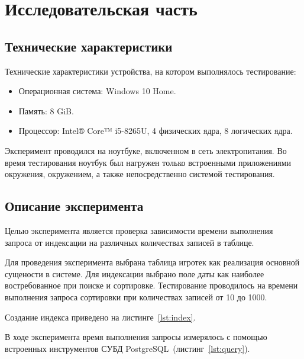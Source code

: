 \chapter{Исследовательская часть}

\section{Технические характеристики}

Технические характеристики устройства, на котором выполнялось тестирование:

\begin{itemize}
	\item Операционная система: Windows 10 Home.
	\item Память: 8 GiB.
    \item Процессор: Intel® Core™ i5-8265U, 4 физических ядра, 8 логических
        ядра.
\end{itemize}

Эксперимент проводился на ноутбуке, включенном в сеть электропитания. Во
время тестирования ноутбук был нагружен только встроенными приложениями
окружения, окружением, а также непосредственно системой тестирования.

\section{Описание эксперимента}

Целью эксперимента является проверка зависимости времени выполнения запроса от
индексации на различных количествах записей в таблице.

Для проведения эксперимента выбрана таблица игротек как реализация основной
сущености в системе. Для индексации выбрано поле даты как наиболее
востребованное при поиске и сортировке. Тестирование проводилось на времени
выполнения запроса сортировки при количествах записей от 10 до 1000.

Создание индекса приведено на листинге~\ref{lst:index}.

{
\captionsetup{format=hang,justification=raggedright,
              singlelinecheck=off,width=16cm}
}

В ходе эксперимента время выполнения запросы измерялось с помощью встроенных
инструментов СУБД PostgreSQL~(листинг~\ref{lst:query}).

{
\captionsetup{format=hang,justification=raggedright,
              singlelinecheck=off,width=16cm}
}

